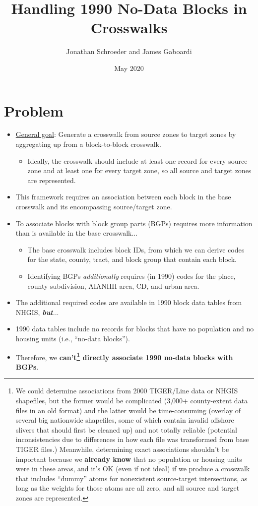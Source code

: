 \documentclass{article}
\title{Handling 1990 No-Data Blocks in Crosswalks}
\author{Jonathan Schroeder and James Gaboardi}
\date{May 2020}
\begin{document}
\maketitle



\section{Problem}
\begin{itemize}
  \item \href{https://github.com/ipums/nhgisxwalk/blob/master/resources/frameworks/general-crosswalk-construction-framework.pdf}{General goal}: Generate a crosswalk from source zones to target zones by aggregating up from a block-to-block crosswalk.
  \begin{itemize}
      \item Ideally, the crosswalk should include at least one record for every source zone and at least one for every target zone, so all source and target zones are represented.
  \end{itemize}
  \item This framework requires an association between each block in the base crosswalk and its encompassing source/target zone.
  \item To associate blocks with block group parts (BGPs) requires more information than is available in the base crosswalk...
  \begin{itemize}
      \item The base crosswalk includes block IDs, from which we can derive codes for the state, county, tract, and block group that contain each block.
      \item Identifying BGPs \textit{additionally} requires (in 1990) codes for the place, county subdivision, AIANHH area, CD, and urban area.
  \end{itemize}
  \item The additional required codes are available in 1990 block data tables from NHGIS, \textbf{\textit{but}}...
  \item 1990 data tables include no records for blocks that have no population and no housing units (i.e., ``no-data blocks'').
  \item Therefore, we \textbf{can't\footnote{We could determine associations from 2000 TIGER/Line data or NHGIS shapefiles, but the former would be complicated (3,000+ county-extent data files in an old format) and the latter would be time-consuming (overlay of several big nationwide shapefiles, some of which contain invalid offshore slivers that should first be cleaned up) and not totally reliable (potential inconsistencies due to differences in how each file was transformed from base TIGER files.) Meanwhile, determining exact associations shouldn't be important because we \textbf{already know} that no population or housing units were in these areas, and it's OK (even if not ideal) if we produce a crosswalk that includes ``dummy'' atoms for nonexistent source-target intersections, as long as the weights for those atoms are all zero, and all source and target zones are represented.} directly associate 1990 no-data blocks with BGPs}.
\end{itemize}
\end{document}

